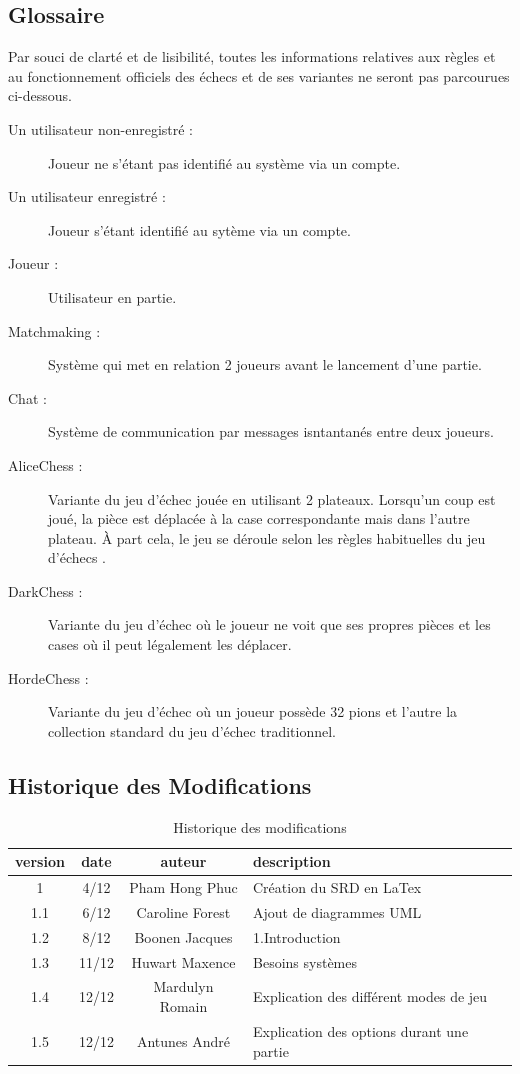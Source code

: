 \documentclass[10pt, a4paper]{article}
\begin{document}
			
			

		\subsection{Glossaire} Par souci de clarté et de lisibilité, toutes les informations relatives aux règles et au fonctionnement officiels des échecs et de ses variantes ne seront pas parcourues ci-dessous. 
		\begin{description}
		\item[Un utilisateur non-enregistré :] Joueur ne s'étant pas identifié au système via un compte.
		\item[Un utilisateur enregistré :] Joueur s'étant identifié au sytème via un compte.
		\item[Joueur :] Utilisateur en partie.
		\item[Matchmaking :] Système qui met en relation 2 joueurs avant le lancement d'une partie.
		\item[Chat :] Système de communication par messages isntantanés entre deux joueurs.
		\item[AliceChess :] Variante du jeu d'échec jouée en utilisant 2 plateaux. Lorsqu'un coup est joué, la pièce est déplacée à la case correspondante mais dans l'autre plateau. À part cela, le jeu se déroule selon les règles habituelles du jeu d'échecs .
		\item[DarkChess :] Variante du jeu d'échec où le joueur ne voit que ses propres pièces et les cases où il peut légalement les déplacer.
		\item[HordeChess :] Variante du jeu d'échec où un joueur possède 32 pions et l'autre la collection standard du jeu d'échec traditionnel.
		\end{description}
		\clearpage
		
		\subsection{Historique des Modifications}
		
		\begin{table}[h!]
			
			\centering
			
			\begin{tabular}{|c|c|c|p{50mm}|}
				\hline
				 \textbf{version} & \textbf{date} & \textbf{auteur}  & \textbf{description} \\ \hline
				 1 & 4/12 & Pham Hong Phuc & Création du SRD en LaTex\\ \hline
				 1.1 & 6/12 & Caroline Forest & Ajout de diagrammes UML\\ \hline
				 1.2 & 8/12 & Boonen Jacques & 1.Introduction\\ \hline 
				 1.3 & 11/12 & Huwart Maxence & Besoins systèmes\\ \hline
				 1.4 & 12/12 & Mardulyn Romain & Explication des différent modes de jeu\\ \hline
				 1.5 & 12/12 & Antunes André & Explication des options durant une partie\\ \hline
\end{tabular}
			\caption*{Historique des modifications}
			\end{table}
\clearpage
\end{document}
